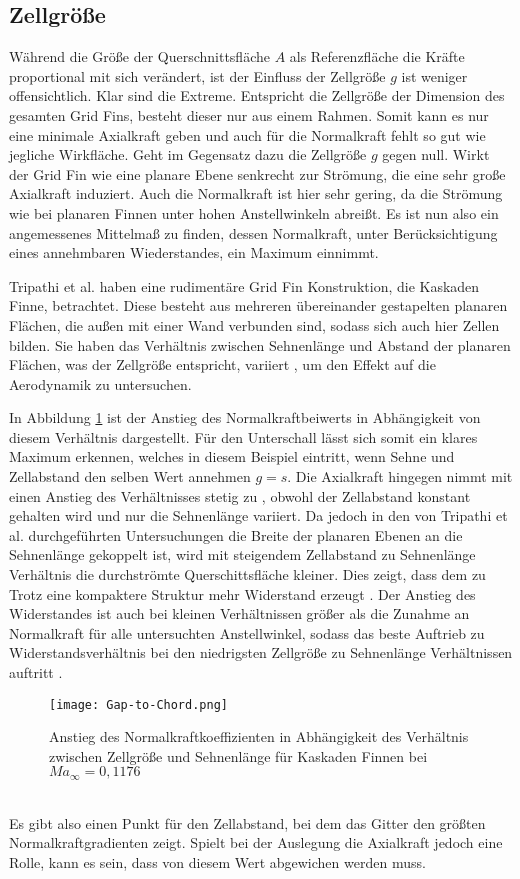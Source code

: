 \subsection{Zellgröße}
Während die Größe der Querschnittsfläche $A$ als Referenzfläche die Kräfte proportional mit sich verändert, ist der Einfluss der Zellgröße $g$ ist weniger offensichtlich. Klar sind die Extreme. Entspricht die Zellgröße der Dimension des gesamten Grid Fins, besteht dieser nur aus einem Rahmen. Somit kann es nur eine minimale Axialkraft geben und auch für die Normalkraft fehlt so gut wie jegliche Wirkfläche. Geht im Gegensatz dazu die Zellgröße $g$ gegen null. Wirkt der Grid Fin wie eine planare Ebene senkrecht zur Strömung, die eine sehr große Axialkraft induziert. Auch die Normalkraft ist hier sehr gering, da die Strömung wie bei planaren Finnen unter hohen Anstellwinkeln abreißt. Es ist nun also ein angemessenes Mittelmaß zu finden, dessen Normalkraft, unter Berücksichtigung eines annehmbaren Wiederstandes, ein Maximum einnimmt.

Tripathi et al. haben eine rudimentäre Grid Fin Konstruktion, die Kaskaden Finne, betrachtet. Diese besteht aus mehreren übereinander gestapelten planaren Flächen, die außen mit einer Wand verbunden sind, sodass sich auch hier Zellen bilden. Sie haben das Verhältnis zwischen Sehnenlänge und Abstand der planaren Flächen, was der Zellgröße entspricht, variiert \cite{ChordVar}, um den Effekt auf die Aerodynamik zu untersuchen.

In Abbildung \ref{abb_Gap-Chord} ist der Anstieg des Normalkraftbeiwerts in Abhängigkeit von diesem Verhältnis dargestellt. Für den Unterschall lässt sich somit ein klares Maximum erkennen, welches in diesem Beispiel eintritt, wenn Sehne und Zellabstand den selben Wert annehmen $g=s$.
Die Axialkraft hingegen nimmt mit einen Anstieg des Verhältnisses stetig zu \cite{ChordVar}, obwohl der Zellabstand konstant gehalten wird und nur die Sehnenlänge variiert. Da jedoch in den von Tripathi et al. durchgeführten Untersuchungen die Breite der planaren Ebenen an die Sehnenlänge gekoppelt ist, wird mit steigendem Zellabstand zu Sehnenlänge Verhältnis die durchströmte Querschittsfläche kleiner. Dies zeigt, dass dem zu Trotz eine kompaktere Struktur mehr Widerstand erzeugt \cite{ChordVar}. Der Anstieg des Widerstandes ist auch bei kleinen Verhältnissen größer als die Zunahme an Normalkraft für alle untersuchten Anstellwinkel, sodass das beste Auftrieb zu Widerstandsverhältnis bei den niedrigsten Zellgröße zu Sehnenlänge Verhältnissen auftritt \cite{ChordVar}.
\begin{figure}[h]
	\centering
	\texttt{[image: Gap-to-Chord.png]}
	\begin{flushright}
	\end{flushright}
	\caption{Anstieg des Normalkraftkoeffizienten in Abhängigkeit des Verhältnis zwischen Zellgröße und Sehnenlänge für Kaskaden Finnen bei $Ma_\infty = 0,1176$}
	\label{abb_Gap-Chord}
\end{figure}\\
Es gibt also einen Punkt für den Zellabstand, bei dem das Gitter den größten Normalkraftgradienten zeigt. Spielt bei der Auslegung die Axialkraft jedoch eine Rolle, kann es sein, dass von diesem Wert abgewichen werden muss.
\newpage
